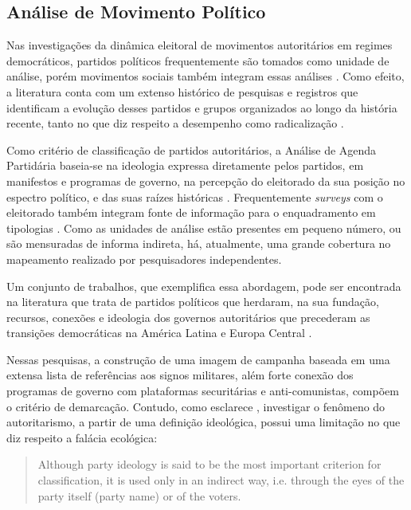 \documentclass[
12pt,				%
openright,			%
twoside,			%
a4paper,			%
english,			%
french,				%
spanish,			%
brazil				%
]{abntex2}
\begin{document}
\subsection{Análise de Movimento Político}

Nas investigações da dinâmica eleitoral de movimentos autoritários em regimes democráticos, partidos políticos frequentemente são tomados como unidade de análise, porém movimentos sociais também integram essas análises \cite{caiani2017radical}. Como efeito, a literatura conta com um extenso histórico de pesquisas e registros que identificam a evolução desses partidos e grupos organizados ao longo da história recente, tanto no que diz respeito a desempenho como radicalização \cite{norris2005radical, mudde2009populist, caiani2017radical, mudde2016introduction, mudde2017ideational}. 

Como critério de classificação de partidos autoritários, a Análise de Agenda Partidária baseia-se na ideologia expressa diretamente pelos partidos, em manifestos e programas de governo, na percepção do eleitorado da sua posição no espectro político, e das suas raízes históricas \cite{mudde2000ideology}. Frequentemente \emph{surveys} com o eleitorado também integram fonte de informação para o enquadramento em tipologias \cite{booth1984political, booth1994paths, macwilliams2016decides}. Como as unidades de análise estão presentes em pequeno número, ou são mensuradas de informa indireta, há, atualmente, uma grande cobertura no mapeamento realizado por pesquisadores independentes.

Um conjunto de trabalhos, que exemplifica essa abordagem, pode ser encontrada na literatura que trata de partidos políticos que herdaram, na sua fundação, recursos, conexões e ideologia dos governos autoritários que precederam as transições democráticas na América Latina \cite{loxton2015authoritarian, loxton2014authoritarian, lyons2016victorious, loxton2015authoritarian} e Europa Central \cite{grzymala2006authoritarian}. 

Nessas pesquisas, a construção de uma imagem de campanha baseada em uma extensa lista de referências aos signos militares, além forte conexão dos programas de governo com plataformas securitárias e anti-comunistas, compõem o critério de demarcação. Contudo, como esclarece , investigar o fenômeno do autoritarismo, a partir de uma definição ideológica, possui uma limitação no que diz respeito a falácia ecológica:

\begin{samepage}
	\begin{quote}
		Although party ideology is said to be the most important criterion for classification, it is used only in an indirect way, i.e. through the eyes of the party itself (party name) or of the voters. \cite{mudde2000ideology}
	\end{quote}
\end{samepage}
\end{document}
